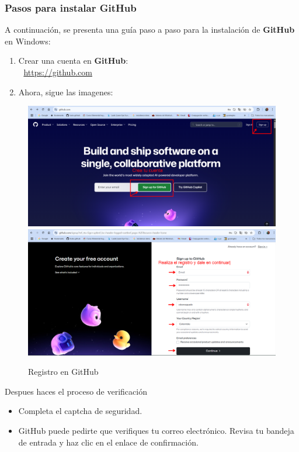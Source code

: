 \documentclass[
]{book}
\begin{document}
\subsubsection{Pasos para instalar GitHub}\label{pasos-para-instalar-github}

A continuación, se presenta una guía paso a paso para la instalación de \textbf{GitHub} en Windows:

\begin{enumerate}
\def\labelenumi{\arabic{enumi}.}
\item
  Crear una cuenta en \textbf{GitHub}:\\
  🔗 \url{https://github.com}
\item
  Ahora, sigue las imagenes:
\end{enumerate}

\begin{figure}

{\centering \includegraphics[width=0.8\linewidth]{images/gh1} \includegraphics[width=0.8\linewidth]{images/gh2} 

}

\caption{Registro en GitHub}\label{fig:github-b-fig}
\end{figure}

Despues haces el proceso de verificación

\begin{itemize}
\item
  Completa el captcha de seguridad.
\item
  GitHub puede pedirte que verifiques tu correo electrónico. Revisa tu bandeja de entrada y haz clic en el enlace de confirmación.
\end{itemize}
\end{document}
